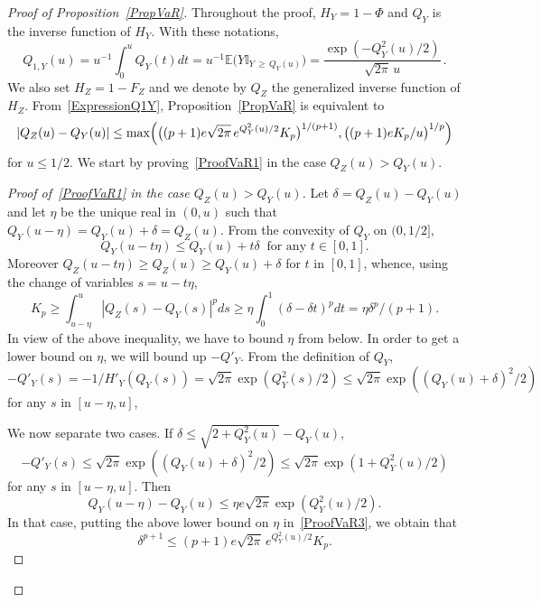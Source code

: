 \documentclass[AHL,Unicode,longabstracts,published]{cedram}
\newcommand{\bbE}{\mathbb{E}}
\newcommand{\bbI}{\mathbb{I}}
\begin{document}
\begin{proof}[{Proof of Proposition~\ref{PropVaR}}]
Throughout the proof, $H_Y = 1 - \Phi$ and $Q_Y$ is the inverse function of $H_Y$. With these notations,
\begin{equation}\label{ExpressionQ1Y}
Q_{1,Y} (u) = u^{-1} \int_0^u Q_Y (t) dt = u^{-1} \bbE \bigl(Y \bbI_{Y\,\geq\,Q_Y (u) } \bigr) =
\frac{ \exp \left(- Q_Y^2 (u) /2\right) }{ \sqrt{2\pi} \, u } \,.
\end{equation}
We also set $H_Z = 1-F_Z$ and we denote by $Q_Z$ the generalized inverse function of $H_Z$. From~\eqref{ExpressionQ1Y}, Proposition~\ref{PropVaR} is equivalent to
\begin{equation}\label{ProofVaR1}
| Q_Z (u) - Q_Y (u) | \leq \max \Bigl(\bigl((p+1)e \sqrt{2\pi} \, e^{Q_Y^2 (u) /2} K_p \bigr)^{1/(p+1)},
\bigl((p+1)e K_p /u \bigr)^{1/p} \Bigr)
\end{equation}
for $u\leq 1/2$. We start by proving~\eqref{ProofVaR1} in the case $Q_Z (u) > Q_Y (u)$.


\begin{proof}[{Proof of~\eqref{ProofVaR1} in the case $Q_Z (u) > Q_Y (u)$}]
Let $\delta = Q_Z (u) - Q_Y (u)$ and let $\eta$ be the unique real in $(0,u)$ such that $Q_Y (u-\eta) = Q_Y (u) + \delta = Q_Z (u)$. From the convexity of $Q_Y$ on $(0,1/2]$,
\begin{equation}\label{ProofVaR2}
Q_Y (u-t\eta) \leq Q_Y (u) + t \delta \ \text{ for any } t\in [0,1].
\end{equation}
Moreover $Q_Z (u - t \eta) \geq Q_Z (u) \geq Q_Y (u) + \delta$ for $t$ in $[0,1]$, whence, using the change of variables $s=u-t\eta$,
\begin{equation}\label{ProofVaR3}
K_p \geq
\int_{u-\eta}^u |Q_Z (s) - Q_Y (s) |^p ds \geq \eta \int_0^1 (\delta -\delta t)^p dt = \eta \delta^p / (p+1).
\end{equation}
In view of the above inequality, we have to bound $\eta$ from below. In order to get a lower bound on $\eta$, we will bound up $-Q'_Y$. From the definition of $Q_Y$,
\[
-Q'_Y (s) = -1/H'_Y (Q_Y (s)) = \sqrt{2\pi} \exp \left(Q_Y^2 (s) / 2\right) \leq \sqrt{2\pi} \exp \left((Q_Y (u) + \delta)^2 /2\right)
\]
for any $s$ in $[u-\eta, u]$,


We now separate two cases. If $\delta \leq \sqrt{2 + Q_Y^2 (u) } - Q_Y (u)$,
\[
- Q'_Y (s) \leq \sqrt{2\pi} \exp \left((Q_Y (u) + \delta)^2 /2\right) \leq \sqrt{2\pi} \exp \left(1 + Q_Y^2 (u) /2\right)
\]
for any $s$ in $[u-\eta, u]$. Then
\begin{equation}\label{Competadelta}
Q_Y (u-\eta) - Q_Y (u) \leq \eta e\sqrt{2\pi} \exp (Q_Y^2 (u) /2).
\end{equation}
In that case, putting the above lower bound on $\eta$ in~\eqref{ProofVaR3}, we obtain that
\begin{equation}\label{ProofVaR4}
\delta^{p+1} \leq (p+1)e \sqrt{2\pi} \, e^{Q_Y^2 (u) /2} K_p.
\end{equation}



\end{proof}
\end{proof}
\end{document}
